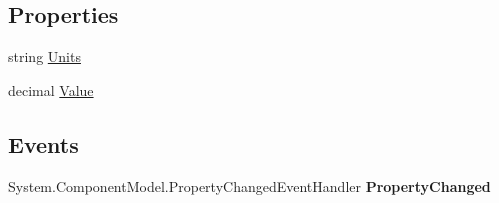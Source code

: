 \subsection*{Properties}
\begin{DoxyCompactItemize}
\item 
\hypertarget{class_price___comparison_1_1amazon_1_1ecs_1_1_decimal_with_units_a90d0041844ecb06c6fffbf22dc32bed8}{string \hyperlink{class_price___comparison_1_1amazon_1_1ecs_1_1_decimal_with_units_a90d0041844ecb06c6fffbf22dc32bed8}{Units}}\label{class_price___comparison_1_1amazon_1_1ecs_1_1_decimal_with_units_a90d0041844ecb06c6fffbf22dc32bed8}

\begin{DoxyCompactList}\small\item\em \end{DoxyCompactList}\item 
\hypertarget{class_price___comparison_1_1amazon_1_1ecs_1_1_decimal_with_units_a96ec96d55465e2a3d557d654735c0467}{decimal \hyperlink{class_price___comparison_1_1amazon_1_1ecs_1_1_decimal_with_units_a96ec96d55465e2a3d557d654735c0467}{Value}}\label{class_price___comparison_1_1amazon_1_1ecs_1_1_decimal_with_units_a96ec96d55465e2a3d557d654735c0467}

\begin{DoxyCompactList}\small\item\em \end{DoxyCompactList}\end{DoxyCompactItemize}
\subsection*{Events}
\begin{DoxyCompactItemize}
\item 
\hypertarget{class_price___comparison_1_1amazon_1_1ecs_1_1_decimal_with_units_acbed2bc5fd7e37b7f5d552d73028053a}{System.\-Component\-Model.\-Property\-Changed\-Event\-Handler {\bfseries Property\-Changed}}\label{class_price___comparison_1_1amazon_1_1ecs_1_1_decimal_with_units_acbed2bc5fd7e37b7f5d552d73028053a}

\end{DoxyCompactItemize}

